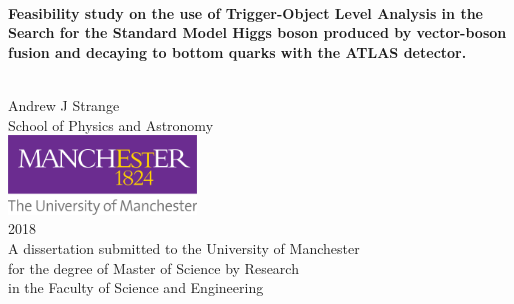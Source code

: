 \ifpdf
\fi
%
%
\begin{center}
 \qquad\\[0mm]
 {\renewcommand\baselinestretch{1.2}\huge\textbf{
%
%
   Feasibility study on the use of Trigger-Object Level Analysis in the Search for the Standard Model Higgs boson produced by vector-boson fusion and decaying to bottom quarks with the ATLAS detector.
%
 }\par}
 \qquad\\[20mm]
 {\LARGE Andrew J Strange}\\[10mm]
 {\large School of Physics and Astronomy}\\[10mm]
 \includegraphics[width=50mm]{UniOfManchesterLogo.png}\\[30mm]
 {\Large 2018}\\[10mm]
 {\large A dissertation submitted to the University of Manchester \\ for the degree of Master of Science by Research \\ in the Faculty of Science and Engineering}
\end{center}

\cleardoublepage

\endinput
